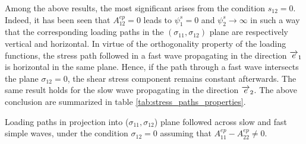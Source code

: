 Among the above results, the most significant arises from the condition $s_{12}=0$.
Indeed, it has been seen that $A_{12}^{ep}=0$ leads to $\psi_1^s=0$ and $\psi^s_2\rightarrow \infty$ in such a way that the corresponding loading paths in the $(\sigma_{11},\sigma_{12})$ plane are respectively vertical and horizontal.
In virtue of the orthogonality property of the loading functions, the stress path followed in a fast wave propagating in the direction ${\overrightarrow{e}}_1$ is horizontal in the same plane.
Hence, if the path through a fast wave intersects the plane $\sigma_{12}=0$, the shear stress component remains constant afterwards.
The same result holds for the slow wave propagating in the direction ${\overrightarrow{e}}_2$.
The above conclusion are summarized in table \ref{tab:stress_paths_properties}.
\begin{table}[h!]
  \centering
  
  \caption{Loading paths in projection into ($\sigma_{11},\sigma_{12}$) plane followed across slow and fast simple waves, under the condition $\sigma_{12}=0$ assuming that $A_{11}^{ep}-A_{22}^{ep}\neq 0$.}
  \label{tab:stress_paths_properties}
\end{table}
